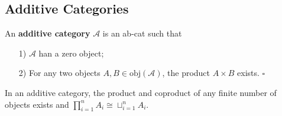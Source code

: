 \documentclass[../category_theory.tex]{subfiles}
\begin{document}
\subsection{Additive Categories}
\begin{def*}
	An \textbf{additive category} \(\mathcal{A}\) is an ab-cat such that
	\begin{itemize}
		\item[1)] \(\mathcal{A}\) han a zero object;
		\item[2)] For any two objects \(A, B\in \mathrm{obj}(\mathcal{A})\), the product \(A\times B\) exists. \(\square\)
	\end{itemize}
\end{def*}
\begin{lemma*}
	In an additive category, the product and coproduct of any finite number of objects exists and \(\prod\limits_{i=1}^{n}A_{i}\cong \sqcup_{i=1}^{n}A_{i}\).
\end{lemma*}
\end{document}
